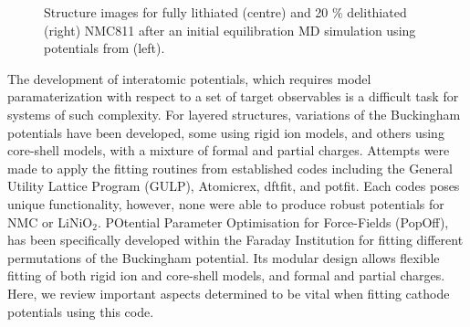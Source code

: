 \documentclass[journal=jacsat,manuscript=article]{achemso}
\begin{document}
\begin{figure}[h]
  \centering
    \caption{\label{fig:structure_collapse} Structure images for fully lithiated (centre) and 20 \% delithiated (right) NMC811 after an initial equilibration MD simulation using potentials from \citeauthor{Lee_and_Park_2012} (left). \cite{Lee_and_Park_2012} }
\end{figure}

The development of interatomic potentials, which requires model paramaterization with respect to a set of target observables is a difficult task for systems of such complexity.  
For layered structures, variations of the Buckingham potentials have been developed, some using rigid ion models,\cite{Lewis_1985, Ledwaba2020, Sayle2005, Dawson2014} and others using core-shell models, \cite{Hart1998, Fisher2010, Lewis_1985,Ammundsen1999, Kerisit2014, He2019,lee2012atomistic} with a mixture of formal and partial charges.
Attempts were made to apply the fitting routines from established codes including the General Utility Lattice Program (GULP), \cite{gale_gulp_1997} Atomicrex, \cite{Stukowski_2017} dftfit, \cite{dftfit} and potfit. \cite{wen_kim-compliant_2017} 
Each codes poses unique functionality, however, none were able to produce robust potentials for NMC or LiNiO$_2$.
POtential Parameter Optimisation for Force-Fields (PopOff),\cite{Morgan2020PopOff} has been specifically developed within the Faraday Institution for fitting different permutations of the Buckingham potential. Its modular design allows flexible fitting of both rigid ion and core-shell models, and formal and partial charges. Here, we review important aspects determined to be vital when fitting cathode potentials using this code.
\end{document}
